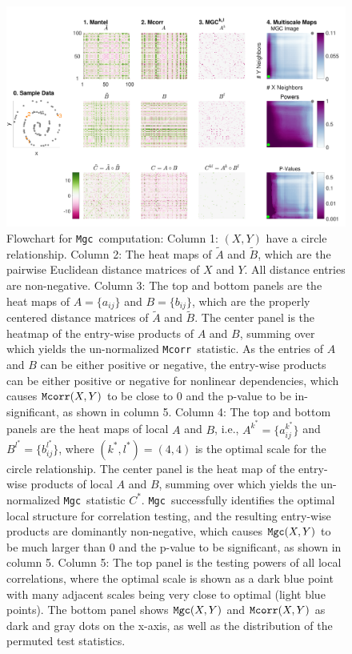 \documentclass[11pt]{article}
\providecommand{\sct}[1]{{\sc \texttt{#1}}}
\newcommand{\G}{C}
\newcommand{\Mgc}{\sct{Mgc}}
\newcommand{\Mcorr}{\sct{Mcorr}}
\begin{document}
\begin{figure}[htbp]
\includegraphics[width=1.0\textwidth]{../Figures/FigA}
\caption{
Flowchart for \Mgc~computation:
Column 1: $(X,Y)$ have a circle relationship.
Column 2: The heat maps of $\tilde{A}$ and $\tilde{B}$, which are the pairwise Euclidean distance matrices of $X$ and $Y$. All distance entries are non-negative.
Column 3: The top and bottom panels are the heat maps of $A=\{a_{ij}\}$ and $B=\{b_{ij}\}$, which are the properly centered distance matrices of $\tilde{A}$ and $\tilde{B}$. The center panel is the heatmap of the entry-wise products of $A$ and $B$, summing over which yields the un-normalized \Mcorr~statistic. As the entries of $A$ and $B$ can be either positive or negative, the entry-wise products can be either positive or negative for nonlinear dependencies, which causes $\Mcorr(X,Y)$ to be close to $0$ and the p-value to be in-significant, as shown in column 5.
Column 4: The top and bottom panels are the heat maps of local $A$ and $B$, i.e., $A^{k^{*}}=\{a^{k^{*}}_{ij}\}$ and $B^{l^{*}}=\{b^{l^{*}}_{ij}\}$, where $(k^{*},l^{*})=(4,4)$ is the optimal scale for the circle relationship. The center panel is the heat map of the entry-wise products of local $A$ and $B$, summing over which yields the un-normalized \Mgc~statistic $\G^{*}$. \Mgc~successfully identifies the optimal local structure for correlation testing, and the resulting entry-wise products are dominantly non-negative, which causes $\Mgc(X,Y)$ to be much larger than $0$ and the p-value to be significant, as shown in column 5.
Column 5: The top panel is the testing powers of all local correlations, where the optimal scale is shown as a dark blue point with many adjacent scales being very close to optimal (light blue points). The bottom panel shows $\Mgc(X,Y)$ and $\Mcorr(X,Y)$ as dark and gray dots on the x-axis, as well as the distribution of the permuted test statistics.}
\label{f:schematic}
\end{figure}
%
\end{document}

